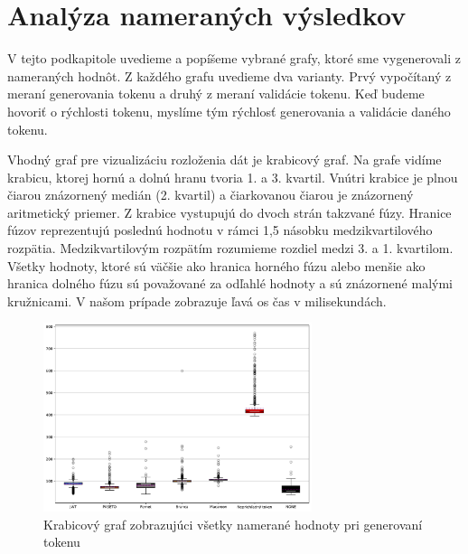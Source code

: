 \section{Analýza nameraných výsledkov}
\label{sec:vyhodnotenie}

V tejto podkapitole uvedieme a popíšeme vybrané grafy, ktoré sme vygenerovali z nameraných hodnôt. Z každého grafu uvedieme dva varianty. Prvý vypočítaný z meraní generovania tokenu a druhý z meraní validácie tokenu. Keď budeme hovoriť o rýchlosti tokenu, myslíme tým rýchlosť generovania a validácie daného tokenu.

Vhodný graf pre vizualizáciu rozloženia dát je krabicový graf. Na grafe vidíme krabicu, ktorej hornú a dolnú hranu tvoria 1. a 3. kvartil. Vnútri krabice je plnou čiarou znázornený medián (2. kvartil) a čiarkovanou čiarou je znázornený aritmetický priemer. Z krabice vystupujú do dvoch strán takzvané fúzy. Hranice fúzov reprezentujú poslednú hodnotu v rámci 1,5 násobku medzikvartilového rozpätia. Medzikvartilovým rozpätím rozumieme rozdiel medzi 3. a 1. kvartilom. Všetky hodnoty, ktoré sú väčšie ako hranica horného fúzu alebo menšie ako hranica dolného fúzu sú považované za odľahlé hodnoty a sú znázornené malými kružnicami. V našom prípade zobrazuje ľavá os čas v milisekundách.

\begin{figure}[H]
  \centerline{\includegraphics[width=0.7\textwidth]{images/signin_boxplot_allW}}
  \caption[Krabicový graf -- generovanie, všetky hodnoty]{Krabicový graf zobrazujúci všetky namerané hodnoty pri generovaní tokenu}
  \label{fig:signin_boxplot_allW}
\end{figure}

